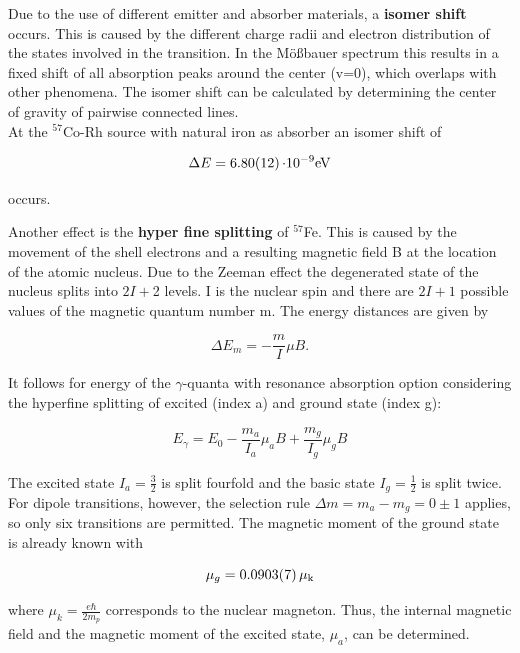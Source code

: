 

Due to the use of different emitter and absorber materials, a \textbf{isomer shift} occurs. This is caused by the different charge radii and electron distribution of the states involved in the transition.
 In the Mößbauer spectrum this results in a fixed shift of all absorption peaks around  the center (v=0), which overlaps with other phenomena. The isomer shift can be calculated by determining the center of gravity of pairwise connected lines. \\
At the $^{57}$Co-Rh source with natural iron as absorber an isomer shift of

\begin{equation}
\label{eq:isofe}
\Delta E = \SI{6.80 \pm 0.12}{\cdot 10^{-9} eV}
\end{equation}

occurs.

Another effect is the \textbf{hyper fine splitting} of $^{57}$Fe. This is caused by the movement of the shell electrons and a resulting magnetic field B at the location of the atomic nucleus. 
Due to the Zeeman effect the degenerated state of the nucleus splits into $2I + $2 levels. I is the nuclear spin and there are $2I+1$ possible values of the magnetic quantum number m. The energy distances are given by

\begin{equation}
\label{eq:hyp1}
\Delta E_m = -\frac{m}{I} \mu B.
\end{equation}

It follows for energy of the $\gamma$-quanta with resonance absorption option considering the hyperfine splitting of excited (index a) and ground state (index g):

\begin{equation}
   E_{\gamma} = E_0 - \frac{m_a}{I_a}\mu_aB + \frac{m_g}{I_g}\mu_gB
\end{equation}

The excited state $I_a = \frac{3}{2}$ is split fourfold and the basic state $I_g =\frac{1}{2}$ is split twice.
For dipole transitions, however, the selection rule $\Delta m = m_a -m_g = 0\pm1$ applies, so only six transitions are permitted. The magnetic moment of the ground state is already known with

\begin{equation}
    \mu_g = \SI{0.0903\pm 0.0007}{\mu_k}
\end{equation}

where $\mu_k=\frac{e \hbar}{2m_p} $ corresponds to the nuclear magneton. Thus, the internal magnetic field and the magnetic moment of the excited state, $\mu_a$, can be determined. 

